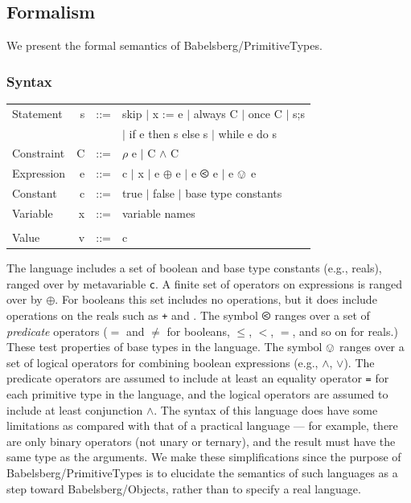 \documentclass{article}
\begin{document}
\subsection{Formalism}
\label{sec:int-formalism}

We present the formal semantics of Babelsberg/PrimitiveTypes. 

\subsubsection{Syntax}
\label{sec:babelsberg-primitivetypes-syntax}


\begin{tt}
\begin{tabular}{lrrl}
{\rm Statement} & s & ::= & skip $\mid$ x := e $\mid$ always C $\mid$ once C $\mid$ s;s \\
  & & & $\mid$ if e then s else s $\mid$ while e do s \\
{\rm Constraint} & C & ::= & $\rho$ e $\mid$ C $\wedge$ C\\
{\rm Expression} & e & ::= & c $\mid$ x $\mid$ e $\oplus$ e  $\mid$ e $\olessthan$ e $\mid$ e $\ovee$ e\\
{\rm Constant} & c & ::= & true $\mid$ false $\mid$ {\rm base type constants}\\
{\rm Variable} & x & ::= & {\rm variable names} \\\\

{\rm Value} & v & ::= & c
\end{tabular}
\end{tt}

The language includes a set of boolean and base type constants (e.g., reals), ranged over by metavariable {\tt c}. A
finite set of operators on expressions is ranged over by $\oplus$. For
booleans this set includes no operations, but it does include
operations on the reals such as {\tt +} and {\tt *}.
The symbol $\olessthan$ ranges over a set of {\em predicate} operators
({\tt $=$} and {\tt $\neq$} for booleans, $\leq$, $<$, $=$, and so on
for reals.)  These test properties of base types in the language. The
symbol $\ovee$ ranges over a set of logical operators for combining
boolean expressions (e.g., {\tt $\wedge$}, {\tt $\vee$}).  The
predicate operators are assumed to include at least an equality
operator {\tt =} for each primitive type in the language, and the
logical operators are assumed to include at least conjunction {\tt $\wedge$}.
The syntax of this language does have some limitations as compared
with that of a practical language --- for example, there are only
binary operators (not unary or ternary), and the result must have the
same type as the arguments.  We make these simplifications since the
purpose of Babelsberg/PrimitiveTypes is to elucidate the semantics of
such languages as a step toward Babelsberg/Objects, rather than to
specify a real language.
\end{document}
